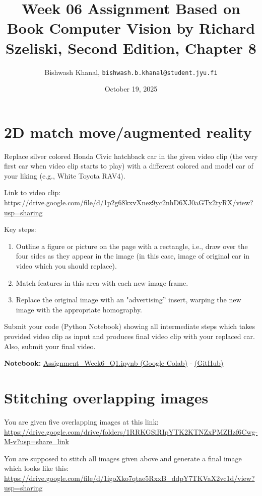 \documentclass[12pt,a4paper]{article}
\title{Week 06 Assignment Based on Book Computer Vision by Richard Szeliski, Second Edition, Chapter 8}
\author{Bishwash Khanal, \texttt{bishwash.b.khanal@student.jyu.fi}}
\date{October 19, 2025}
\begin{document}
\maketitle

\section{2D match move/augmented reality}
Replace silver colored Honda Civic hatchback car in the given video clip (the very first car when video clip starts to play) with a different 
colored and model car of your liking (e.g., White Toyota RAV4).

Link to video clip: \url{https://drive.google.com/file/d/1p2g68kxvXnez9yc2nhD6XJ0aGTx2tyRX/view?usp=sharing}

Key steps:
\begin{enumerate}
    \item Outline a figure or picture on the page with a rectangle, i.e., draw over the four sides as they appear in the image (in this case, 
    image of original car in video which you should replace).
    \item Match features in this area with each new image frame.
    \item Replace the original image with an "advertising” insert, warping the new image with the appropriate homography.
\end{enumerate}

Submit your code (Python Notebook) showing all intermediate steps which takes provided video clip as input and produces final 
video clip with your replaced car. Also, submit your final video.

\textbf{Notebook:} \href{https://colab.research.google.com/drive/1OZt7T49P2ZPpzY2lZ0QwqZ9DZT61-5yQ?usp=sharing}{Assignment\_Week6\_Q1.ipynb (Google Colab)} - 
\href{https://github.com/bkhanal-11/ties411_cvip_jyu/blob/master/assignment6/src/Assignment_Week6_Q1.ipynb}{(GitHub)}

\section{Stitching overlapping images}
You are given five overlapping images at this link: \url{https://drive.google.com/drive/folders/1RRKGSiRIpYTK2KTNZxPMZHzf6Cwg-M-v?usp=share_link}

You are supposed to stitch all images given above and generate a final image which looks like 
this: \url{https://drive.google.com/file/d/1igoXko7qtae5RxxB_ddpY7TKVaX2vc1d/view?usp=sharing}
\end{document}
